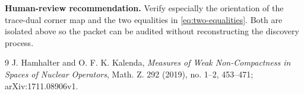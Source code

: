 \documentclass[11pt]{article}
\begin{document}
\textbf{Human-review recommendation.} Verify especially the orientation of
the trace-dual corner map and the two equalities in
\eqref{eq:two-equalities}.  Both are isolated above so the packet can be
audited without reconstructing the discovery process.

\begin{thebibliography}{9}
J. Hamhalter and O. F. K. Kalenda,
\emph{Measures of Weak Non-Compactness in Spaces of Nuclear Operators},
Math. Z. 292 (2019), no. 1--2, 453--471;
arXiv:1711.08906v1.
\end{thebibliography}
\end{document}
